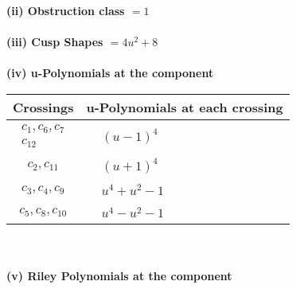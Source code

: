 \documentclass[1p]{elsarticle_modified}
\theoremstyle{definition}
\begin{document}
\flushleft \textbf{(ii) Obstruction class $= 1$}\\~\\
\flushleft \textbf{(iii) Cusp Shapes $= 4 u^2+8$}\\~\\
\newpage\renewcommand{\arraystretch}{1}
\flushleft \textbf{(iv) u-Polynomials at the component}\newline \\
\begin{tabular}{m{50pt}|m{274pt}}
Crossings & \hspace{64pt}u-Polynomials at each crossing \\
\hline $$\begin{aligned}c_{1},c_{6},c_{7}\\c_{12}\end{aligned}$$&$\begin{aligned}
&(u-1)^4
\end{aligned}$\\
\hline $$\begin{aligned}c_{2},c_{11}\end{aligned}$$&$\begin{aligned}
&(u+1)^4
\end{aligned}$\\
\hline $$\begin{aligned}c_{3},c_{4},c_{9}\end{aligned}$$&$\begin{aligned}
&u^4+u^2-1
\end{aligned}$\\
\hline $$\begin{aligned}c_{5},c_{8},c_{10}\end{aligned}$$&$\begin{aligned}
&u^4- u^2-1
\end{aligned}$\\
\hline
\end{tabular}\\~\\
\newpage\renewcommand{\arraystretch}{1}
\flushleft \textbf{(v) Riley Polynomials at the component}\newline \\
\end{document}
